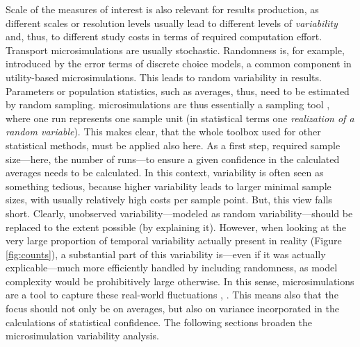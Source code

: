 Scale of the measures of interest is also relevant for results production, as different scales or resolution levels usually lead to different levels of \emph{variability} and, thus, to different study costs in terms of required computation effort. Transport microsimulations are usually stochastic. Randomness is, for example, introduced by the error terms of discrete choice models, a common component in utility-based \glspl{microsimulation}. This leads to random variability in results. Parameters or population statistics, such as averages, thus, need to be estimated by random sampling. \Glspl{microsimulation} are thus essentially a sampling tool \citep[][]{WolfDA_CSP_2001}, where one run represents one sample unit (in statistical terms one \emph{realization of a random variable}). This makes clear, that the whole toolbox used for other statistical methods, must be applied also here. As a first step, required sample size---here, the number of runs---to ensure a given confidence in the calculated averages needs to be calculated. In this context, variability is often seen as something tedious, because higher variability leads to larger minimal sample sizes, with usually relatively high costs per sample point. But, this view falls short. Clearly, unobserved variability---modeled as random variability---should be replaced to the extent possible (by explaining it). However, when looking at the very large proportion of temporal variability actually present in reality (Figure \ref{fig:counts}), a substantial part of this variability is---even if it was actually explicable---much more efficiently handled by including randomness, as model complexity would be prohibitively large otherwise. In this sense, \glspl{microsimulation} are a tool to capture these real-world fluctuations \citep[][p.11]{NewmanMEJBarkema_1999}, \citep[][p.704]{EsserNagel2001iatbr00-book}. This means also that the focus should not only be on averages, but also on variance incorporated in the calculations of statistical confidence. The following sections broaden the microsimulation variability analysis.

